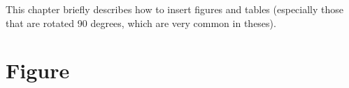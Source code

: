 This chapter briefly describes how to insert figures and tables (especially those that are rotated 90 degrees, which are very common in theses).

\section{Figure}




